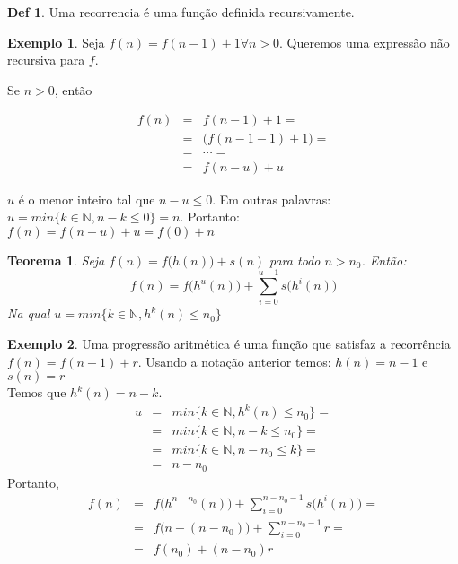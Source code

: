 \documentclass[a4paper,11pt]{article}
\theoremstyle{definition} \newtheorem{definicao}{Def}
\theoremstyle{definition} \newtheorem{exemplo}{Exemplo}
\theoremstyle{plain}      \newtheorem{teorema}{Teorema}
\theoremstyle{remark}     \newtheorem*{corolario}{Corol\'{a}rio}
\begin{document}
\begin{definicao}
Uma recorrencia \'{e} uma fun\c{c}\~{a}o definida recursivamente.
\end{definicao}

\begin{exemplo}
Seja $f(n) = f(n-1) + 1 \forall n > 0$. Queremos uma express\~{a}o
n\~{a}o recursiva para $f$.

Se $n > 0$, ent\~{a}o

\begin{eqnarray*}
f(n) & = & f(n-1) + 1 = \\
& = & \Big(f(n-1-1) + 1\Big) = \\
& = & \cdots = \\
& = & f(n-u) + u
\end{eqnarray*}

$u$ \'{e} o menor inteiro tal que $n - u \leq 0$. Em outras palavras: \\
$u = min\{k \in \mathbb{N}, n -k \leq 0\} = n$. Portanto: \\
$f(n) = f(n-u) + u = f(0) + n$
\end{exemplo}

\begin{teorema}
Seja $f(n) = f\Big(h(n)\Big) + s(n)$ para todo $n > n_0$.
Ent\~{a}o: \\
\begin{equation*}
f(n) = f\Big(h^u(n)\Big) + \sum_{i=0}^{u-1} s\Big(h^i(n)\Big)
\end{equation*}
Na qual $u = min\{k \in \mathbb{N}, h^k(n) \leq n_0\}$
\end{teorema}

\begin{exemplo}
Uma progress\~{a}o aritm\'{e}tica \'{e} uma fun\c{c}\~{a}o que satisfaz
a recorr\^{e}ncia $f(n) = f(n-1) + r$. Usando a nota\c{c}\~{a}o anterior
temos: $h(n) = n - 1$ e $s(n) = r$ \\
Temos que $h^k(n) = n - k$.
\begin{eqnarray*}
u & = & min\{k \in \mathbb{N}, h^k(n) \leq n_0\} = \\
& = & min\{k \in \mathbb{N}, n - k \leq n_0\} = \\
& = & min\{k \in \mathbb{N}, n - n_0 \leq k\} = \\
& = & n - n_0
\end{eqnarray*}
Portanto,
\begin{eqnarray*}
f(n) & = & f\Big(h^{n-n_0}(n)\Big) + \sum_{i = 0}^{n - n_0 - 1}
s\Big(h^i(n)\Big) = \\
& = & f\Big(n - (n - n_0)\Big) + \sum_{i = 0}^{n - n_0 - 1} r = \\
& = & f(n_0) + (n-n_0)r
\end{eqnarray*}
\end{exemplo}
\end{document}
